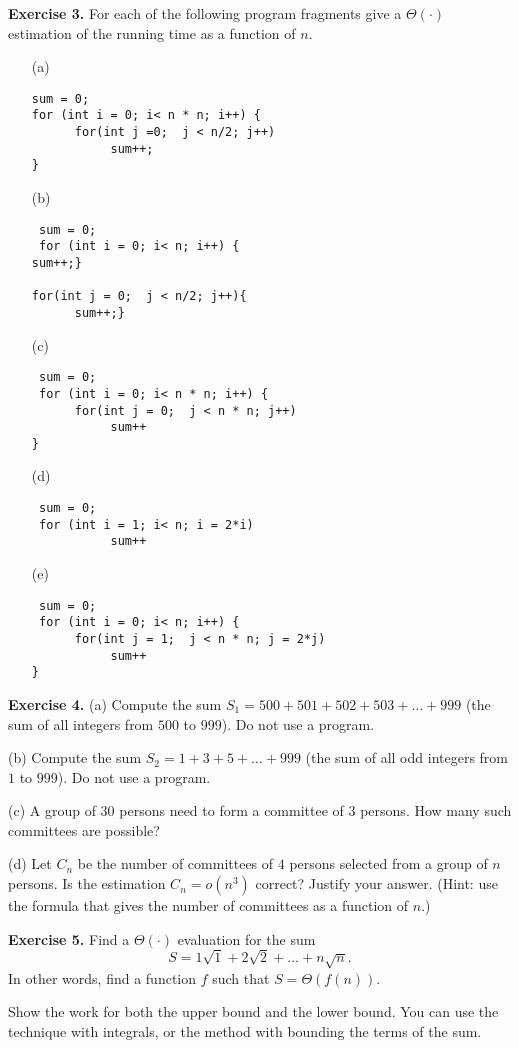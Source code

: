 \documentclass[11pt]{article}
\begin{document}
\textbf{Exercise 3.}
For each of the following program fragments give a $\Theta(\cdot)$  estimation of the running time as a function of $n$.
\begin{itemize}
\item[(a)]
\begin{verbatim}
sum = 0;
for (int i = 0; i< n * n; i++) {
      for(int j =0;  j < n/2; j++)
    	   sum++;
}

\end{verbatim}
\item[(b)]
\begin{verbatim}
 sum = 0;
 for (int i = 0; i< n; i++) {
sum++;}

for(int j = 0;  j < n/2; j++){
      sum++;}

\end{verbatim}

\item[(c)]
\begin{verbatim}
 sum = 0;
 for (int i = 0; i< n * n; i++) {
      for(int j = 0;  j < n * n; j++)
           sum++
}
\end{verbatim}


\item[(d)]
\begin{verbatim}
 sum = 0;
 for (int i = 1; i< n; i = 2*i)
           sum++

\end{verbatim}


\item[(e)]
\begin{verbatim}
 sum = 0;
 for (int i = 0; i< n; i++) {
      for(int j = 1;  j < n * n; j = 2*j)
           sum++
}
\end{verbatim}


\end{itemize}
\bigskip

\textbf{Exercise 4.}
(a) Compute the sum $S_1 = 500 + 501+ 502 + 503 + \ldots + 999$ (the sum of all integers from $500$ to $999$). Do not use a program.
\smallskip

(b) Compute the sum $S_2 = 1 + 3 + 5 + \ldots + 999$  (the sum of all odd integers from $1$ to $999$).   Do not use a program.
\smallskip

(c) A group of $30$ persons need to form a committee of $3$ persons. How many such committees are possible?
\smallskip

(d) Let $C_n$ be the number of committees of $4$ persons selected from a group of $n$ persons.  Is the estimation
$C_n = o(n^3)$ correct? Justify your answer. (Hint: use the formula that gives the number of committees as a function of $n$.)
\bigskip

\textbf{Exercise 5.}
Find a $\Theta(\cdot)$ evaluation for the sum
\[
S = 1\sqrt{1} + 2 \sqrt{2} + \ldots + n \sqrt{n}.
\]
In other words, find a function $f$ such that $S = \Theta(f(n))$.
\medskip

Show the work for both the upper bound and the lower bound. You can use the technique with integrals, or the  method with bounding the terms of the sum.
\end{document}
